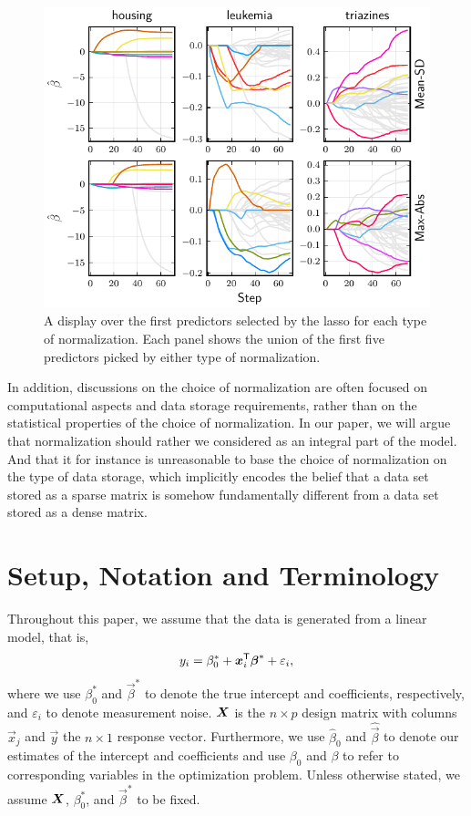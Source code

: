 \begin{figure}[bpt]
  \centering
  \includegraphics[]{plots/realdata_paths.pdf}
  \caption{%
    A display over the first predictors selected by the lasso for each type of normalization. Each panel shows the union of the first five predictors picked by either type of normalization.
  }
  \label{fig:realdata-paths}
\end{figure}

In addition, discussions on the choice of normalization are often focused on computational aspects and data storage requirements, rather than on the statistical properties of the choice of normalization. In our paper, we will argue that normalization should rather we considered as an integral part of the model. And that it for instance is unreasonable to base the choice of normalization on the type of data storage, which implicitly encodes the belief that a data set stored as a sparse matrix is somehow fundamentally different from a data set stored as a dense matrix.

\section{Setup, Notation and Terminology}

Throughout this paper, we assume that the data is generated from a linear model, that is,
\[
  y_i = \beta_0^* + \boldsymbol x_i^{\mathsf{T}} \boldsymbol\beta^* + \varepsilon_i,
\]
where we use \(\beta_0^*\) and \(\vec\beta^*\) to denote the true intercept and coefficients, respectively, and \(\varepsilon_i\) to denote measurement noise. \(\boldsymbol X\) is the \(n \times p\) design matrix with columns \(\vec x_j\) and \(\vec y\) the \(n \times 1\) response vector.
Furthermore, we use \(\hat\beta_0\) and \(\hat{\vec{\beta}}\) to denote our estimates of the intercept and coefficients and use \(\beta_0\) and \(\beta\) to refer to corresponding variables in the optimization problem.
Unless otherwise stated, we assume \(\boldsymbol{X}\), \(\beta_0^*\), and \(\vec{\beta}^*\) to be fixed.

